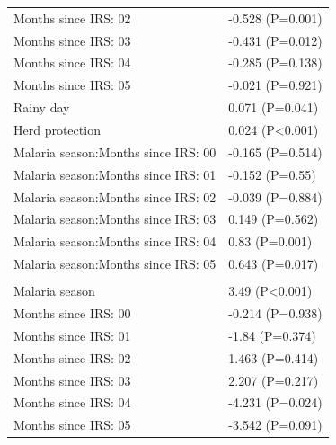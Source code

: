 \documentclass[]{article}
\begin{document}
\begin{longtable}[t]{ll}
\hspace{1em}Months since IRS: 02 & -0.528 (P=0.001)\\
\hspace{1em}Months since IRS: 03 & -0.431 (P=0.012)\\
\hspace{1em}Months since IRS: 04 & -0.285 (P=0.138)\\
\hspace{1em}Months since IRS: 05 & -0.021 (P=0.921)\\
\hspace{1em}Rainy day & 0.071 (P=0.041)\\
\hspace{1em}Herd protection & 0.024 (P<0.001)\\
\hspace{1em}Malaria season:Months since IRS: 00 & -0.165 (P=0.514)\\
\hspace{1em}Malaria season:Months since IRS: 01 & -0.152 (P=0.55)\\
\hspace{1em}Malaria season:Months since IRS: 02 & -0.039 (P=0.884)\\
\hspace{1em}Malaria season:Months since IRS: 03 & 0.149 (P=0.562)\\
\hspace{1em}Malaria season:Months since IRS: 04 & 0.83 (P=0.001)\\
\hspace{1em}Malaria season:Months since IRS: 05 & 0.643 (P=0.017)\\
\addlinespace[1.5em]
\multicolumn{2}{l}{\textbf{Temporary not field worker}}\\
\hspace{1em}Malaria season & 3.49 (P<0.001)\\
\hspace{1em}Months since IRS: 00 & -0.214 (P=0.938)\\
\hspace{1em}Months since IRS: 01 & -1.84 (P=0.374)\\
\hspace{1em}Months since IRS: 02 & 1.463 (P=0.414)\\
\hspace{1em}Months since IRS: 03 & 2.207 (P=0.217)\\
\hspace{1em}Months since IRS: 04 & -4.231 (P=0.024)\\
\hspace{1em}Months since IRS: 05 & -3.542 (P=0.091)\\

\end{longtable}
\end{document}

